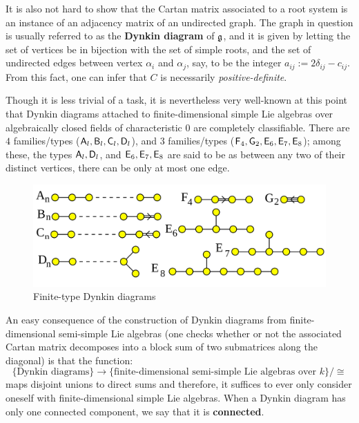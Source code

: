         \begin{remark}
            It is also not hard to show that the Cartan matrix associated to a root system is an instance of an adjacency matrix of an undirected graph. The graph in question is usually referred to as the \textbf{Dynkin diagram} of $\mathfrak{g}$, and it is given by letting the set of vertices be in bijection with the set of simple roots, and the set of undirected edges between vertex $\alpha_i$ and $\alpha_j$, say, to be the integer $a_{ij} := 2 \delta_{ij} - c_{ij}$. From this fact, one can infer that $C$ is necessarily \textit{positive-definite}.

            Though it is less trivial of a task, it is nevertheless very well-known at this point that Dynkin diagrams attached to finite-dimensional simple Lie algebras over algebraically closed fields of characteristic $0$ are completely classifiable. There are $4$  families/types ($\mathsf{A}_l, \mathsf{B}_l, \mathsf{C}_l, \mathsf{D}_l$), and $3$  families/types ($\mathsf{F}_4, \mathsf{G}_2, \mathsf{E}_6, \mathsf{E}_7, \mathsf{E}_8$); among these, the types $\mathsf{A}_l, \mathsf{D}_l$, and $\mathsf{E}_6, \mathsf{E}_7, \mathsf{E}_8$ are said to be  as between any two of their distinct vertices, there can be only at most one edge.
            \begin{figure}[H]
                \centering
                \includegraphics[width=0.5\linewidth]{Notes/Finite-dimensional simple Lie algebras/finite_type_dynkin_diagrams.png}
                \caption{Finite-type Dynkin diagrams}
                \label{fig: finite_type_dynkin_diagrams}
            \end{figure}
            
            An easy consequence of the construction of Dynkin diagrams from finite-dimensional semi-simple Lie algebras (one checks whether or not the associated Cartan matrix decomposes into a block sum of two submatrices along the diagonal) is that the function:
                $$\{ \text{Dynkin diagrams} \} \to \{ \text{finite-dimensional semi-simple Lie algebras over $k$} \}/\cong$$
            maps disjoint unions to direct sums and therefore, it suffices to ever only consider oneself with finite-dimensional simple Lie algebras. When a Dynkin diagram has only one connected component, we say that it is \textbf{connected}.
        \end{remark}
